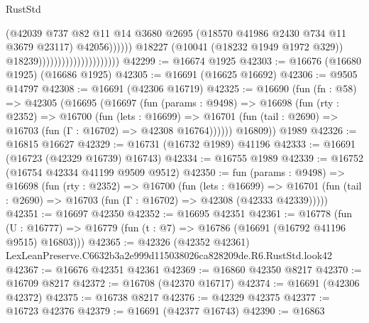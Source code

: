 \begin{lexlean}{RustStd}
\begin{coremodule}
                                                        (@42039
                                                          @737
                                                          @82
                                                          @11
                                                          @14
                                                          @3680
                                                          @2695
                                                          (@18570
                                                            @41986
                                                            @2430
                                                            @734
                                                            @11
                                                            @3679
                                                            @23117)
                                                          @42056))))))
                                              @18227
                                              (@10041 (@18232 @1949 @1972 @329))
                                              @18239)))))))))))))))))))))
@42299 := @16674 @1925
@42303 := @16676 (@16680 @1925) (@16686 @1925)
@42305 := @16691 (@16625 @16692)
@42306 := @9505 @14797
@42308 := @16691 (@42306 @16719)
@42325 := @16690
    (fun (fn : @58) =>
    @42305
      (@16695
        (@16697
          (fun (params : @9498) =>
          @16698
            (fun (rty : @2352) =>
            @16700
              (fun (lets : @16699) =>
              @16701 (fun (tail : @2690) => @16703 (fun (Γ : @16702) => @42308 @16764))))))
        @16809))
    @1989
@42326 := @16815 @16627
@42329 := @16731 (@16732 @1989) @41196
@42333 := @16691 (@16723 (@42329 @16739) @16743)
@42334 := @16755 @1989
@42339 := @16752 (@16754 @42334 @41199 @9509 @9512)
@42350 := fun (params : @9498) =>
  @16698
    (fun (rty : @2352) =>
    @16700
      (fun (lets : @16699) =>
      @16701 (fun (tail : @2690) => @16703 (fun (Γ : @16702) => @42308 (@42333 @42339)))))
@42351 := @16697 @42350
@42352 := @16695 @42351
@42361 := @16778
    (fun (U : @16777) => @16779 (fun (t : @7) => @16786 (@16691 (@16792 @41196 @9515) @16803)))
@42365 := @42326 (@42352 @42361) LexLeanPreserve.C6632b3a2e999d115038026ca828209de.R6.RustStd.look42
@42367 := @16676 @42351 @42361
@42369 := @16860 @42350 @8217
@42370 := @16709 @8217
@42372 := @16708 (@42370 @16717)
@42374 := @16691 (@42306 @42372)
@42375 := @16738 @8217
@42376 := @42329 @42375
@42377 := @16723 @42376
@42379 := @16691 (@42377 @16743)
@42390 := @16863

\end{coremodule}
\end{lexlean}
